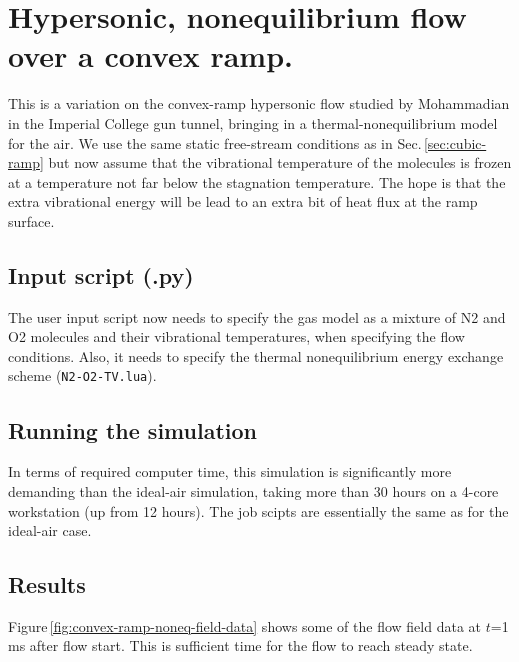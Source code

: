 
\section{Hypersonic, nonequilibrium flow over a convex ramp.}
\label{sec:convex-ramp-noneq}
%
This is a variation on the convex-ramp hypersonic flow studied by Mohammadian\,\cite{mohammadian_1972a}
in the Imperial College gun tunnel, bringing in a thermal-nonequilibrium model for the air.
We use the same static free-stream conditions as in Sec.\,\ref{sec:cubic-ramp}
but now assume that the vibrational temperature of the molecules is frozen 
at a temperature not far below the stagnation temperature.
The hope is that the extra vibrational energy will be lead to an extra bit of heat flux at the ramp surface.

\bigskip
\subsection{Input script (.py)}
%
The user input script now needs to specify the gas model as a mixture of N2 and O2 molecules and
their vibrational temperatures, when specifying the flow conditions.
Also, it needs to specify the thermal nonequilibrium energy exchange scheme (\verb!N2-O2-TV.lua!).

\noindent
\topbar

\bottombar

\noindent
\topbar

\bottombar


\bigskip
\subsection{Running the simulation}
%
In terms of required computer time, 
this simulation is significantly more demanding than the ideal-air simulation,
taking more than 30 hours on a 4-core workstation (up from 12 hours).
The job scipts are essentially the same as for the ideal-air case.

\subsection{Results}
%
Figure\,\ref{fig:convex-ramp-noneq-field-data} shows some of the flow field data 
at $t$=1\,ms after flow start.
This is sufficient time for the flow to reach steady state.

